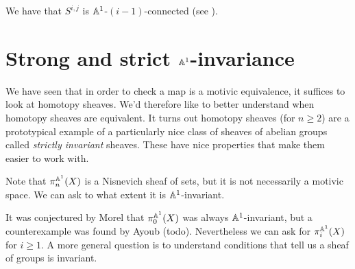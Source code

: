 \documentclass[11pt]{amsart}
\begin{document}
\begin{example} We have that $S^{i,j}$ is $\mathbb{A}^1$-$(i-1)$-connected (see \cite[2.4.5]{AO-contractible}).
\end{example}








\section{Strong and strict $\mathbb{A}^1$-invariance}

\begin{goal} 
We have seen that in order to check a map is a motivic equivalence, it suffices to look at homotopy sheaves. We'd therefore like to better understand when homotopy sheaves are equivalent. It turns out homotopy sheaves (for $n\ge 2$) are a prototypical example of a particularly nice class of sheaves of abelian groups called \textit{strictly invariant} sheaves. These have nice properties that make them easier to work with.
\end{goal}



Note that $\pi_n^{\mathbb{A}^1}(X)$ is a Nisnevich sheaf of sets, but it is not necessarily a motivic space. We can ask to what extent it is $\mathbb{A}^1$-invariant.

It was conjectured by Morel that $\pi_0^{\mathbb{A}^1}(X)$ was always $\mathbb{A}^1$-invariant, but a counterexample was found by Ayoub (todo). Nevertheless we can ask for $\pi_i^{\mathbb{A}^1}(X)$ for $i\ge 1$. A more general question is to understand conditions that tell us a sheaf of groups is invariant.
\end{document}
